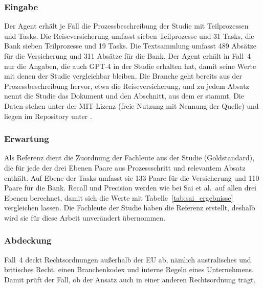 \subsubsection{Eingabe}\label{sec:fall4_eingabe}
Der Agent erhält je Fall die Prozessbeschreibung der Studie mit Teilprozessen und Tasks.
Die Reiseversicherung umfasst sieben Teilprozesse und 31 Tasks, die Bank sieben Teilprozesse und 19 Tasks.
Die Textsammlung umfasst 489 Absätze für die Versicherung und 311 Absätze für die Bank.
Der Agent erhält in Fall~4 nur die Angaben, die auch GPT-4 in der Studie erhalten hat, damit seine Werte mit denen der Studie vergleichbar bleiben.
Die Branche geht bereits aus der Prozessbeschreibung hervor, etwa die Reiseversicherung, und zu jedem Absatz nennt die Studie das Dokument und den Abschnitt, aus dem er stammt.
Die Daten stehen unter der MIT-Lizenz (freie Nutzung mit Nennung der Quelle) und liegen im Repository unter .

\subsubsection{Erwartung}\label{sec:fall4_erwartung}
Als Referenz dient die Zuordnung der Fachleute aus der Studie (Goldstandard), die für jede der drei Ebenen Paare aus Prozessschritt und relevantem Absatz enthält.
Auf Ebene der Tasks umfasst sie 133 Paare für die Versicherung und 110 Paare für die Bank.
Recall und Precision werden wie bei Sai et al.\ auf allen drei Ebenen berechnet, damit sich die Werte mit Tabelle~\ref{tab:sai_ergebnisse} vergleichen lassen.
Die Fachleute der Studie haben die Referenz erstellt, deshalb wird sie für diese Arbeit unverändert übernommen.

\subsubsection{Abdeckung}\label{sec:fall4_abdeckung}
Fall~4 deckt Rechtsordnungen außerhalb der EU ab, nämlich australisches und britisches Recht, einen Branchenkodex und interne Regeln eines Unternehmens.
Damit prüft der Fall, ob der Ansatz auch in einer anderen Rechtsordnung trägt.

